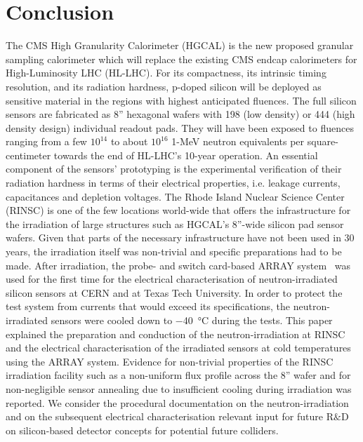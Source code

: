 \section{Conclusion}
\label{sec:conclusion}
The CMS High Granularity Calorimeter (HGCAL) is the new proposed granular sampling calorimeter which will replace the existing CMS endcap calorimeters for High-Luminosity LHC (HL-LHC).
For its compactness, its intrinsic timing resolution, and its radiation hardness, p-doped silicon will be deployed as sensitive material in the regions with highest anticipated fluences.
The full silicon sensors are fabricated as 8'' hexagonal wafers with 198 (low density) or 444 (high density design) individual readout pads.
They will have been exposed to fluences ranging from  a few $10^{14}$ to about $10^{16}$ 1-MeV neutron equivalents per square-centimeter towards the end of HL-LHC's 10-year operation.\newline
An essential component of the sensors' prototyping is the experimental verification of their radiation hardness in terms of their electrical properties, i.e. leakage currents, capacitances and depletion voltages.
The Rhode Island Nuclear Science Center (RINSC) is one of the few locations world-wide that offers the infrastructure for the irradiation of large structures such as HGCAL's 8''-wide silicon pad sensor wafers.
Given that parts of the necessary infrastructure have not been used in 30$~$years, the irradiation itself was non-trivial and specific preparations had to be made.
After irradiation, the probe- and switch card-based ARRAY system~\cite{pitters:array2019} was used for the first time for the electrical characterisation of neutron-irradiated silicon sensors at CERN and at Texas Tech University.
In order to protect the test system from currents that would exceed its specifications, the neutron-irradiated sensors were cooled down to \SI{-40}{\celsius} during the tests.\newline
This paper explained the preparation and conduction of the neutron-irradiation at RINSC and the electrical characterisation of the irradiated sensors at cold temperatures using the ARRAY system.
Evidence for non-trivial properties of the RINSC irradiation facility such as a non-uniform flux profile across the 8'' wafer and for non-negligible sensor annealing due to insufficient cooling during irradiation was reported.
We consider the procedural documentation on the neutron-irradiation and on the subsequent electrical characterisation relevant input for future R$\&$D on silicon-based detector concepts for potential future colliders.\newline
